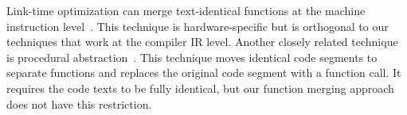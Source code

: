 Link-time optimization can merge text-identical functions at the machine instruction level~\cite{tallam10,kwan12,msvc-icf}. This technique is hardware-specific but is orthogonal to our techniques that work at the compiler IR level. Another closely related technique is procedural abstraction~\cite{loki04,dreweke07,chabbi21}. This technique moves identical code segments to separate functions and replaces the original code segment with a function call. It requires the code texts to be fully identical,  but our function merging approach does not have this restriction. 






